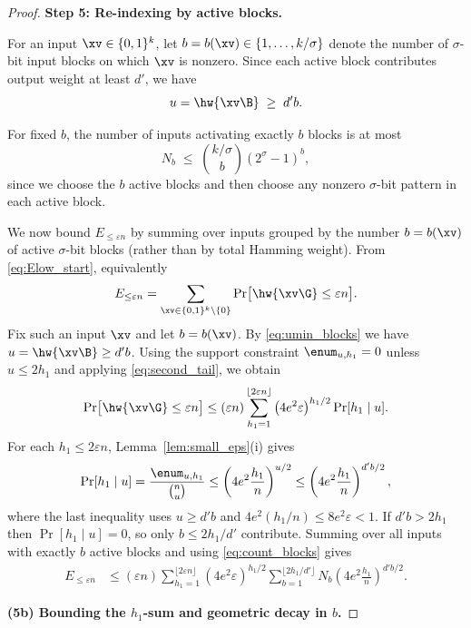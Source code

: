 \begin{proof}
\medskip
\noindent\textbf{Step 5: Re-indexing by active blocks.}

For an input $\xv\in\{0,1\}^k$, let $b=b(\xv)\in\{1,\dots,k/\sigma\}$ denote
the number of $\sigma$-bit input blocks on which $\xv$ is nonzero.
Since each active block contributes output weight at least $d'$, we have
\begin{equation}
\label{eq:umin_blocks}
u=\hw{\xv\B}\;\ge\; d' b .
\end{equation}

For fixed $b$, the number of inputs activating exactly $b$ blocks is at most
\begin{equation}
\label{eq:count_blocks}
N_b \;\le\; \binom{k/\sigma}{b}(2^\sigma-1)^b,
\end{equation}
since we choose the $b$ active blocks and then choose any nonzero
$\sigma$-bit pattern in each active block.


We now bound $E_{\le \varepsilon n}$ by summing over inputs grouped by the number
$b=b(\xv)$ of active $\sigma$-bit blocks (rather than by total Hamming weight).
From \eqref{eq:Elow_start}, equivalently
\[
E_{\le \varepsilon n}
=
\sum_{\xv\in\{0,1\}^k\setminus\{0\}}
\Pr\!\big[\hw{\xv\G}\le \varepsilon n\big].
\]
Fix such an input $\xv$ and let $b=b(\xv)$. By \eqref{eq:umin_blocks} we have
$u=\hw{\xv\B}\ge d'b$. Using the support constraint $\enum_{u,h_1}=0$ unless
$u\le 2h_1$ and applying \eqref{eq:second_tail}, we obtain
\[
\Pr\!\big[\hw{\xv\G}\le \varepsilon n\big]
\le
(\varepsilon n)\sum_{h_1=1}^{\lfloor 2\varepsilon n\rfloor}
\left(4e^2\varepsilon\right)^{h_1/2}\Pr[h_1\mid u].
\]
For each $h_1\le 2\varepsilon n$, Lemma~\ref{lem:small_eps}(i) gives
\[
\Pr[h_1\mid u]=\frac{\enum_{u,h_1}}{\binom{n}{u}}
\le
\left(4e^2\frac{h_1}{n}\right)^{u/2}
\le
\left(4e^2\frac{h_1}{n}\right)^{d'b/2},
\]
where the last inequality uses $u\ge d'b$ and $4e^2(h_1/n)\le 8e^2\varepsilon<1$.
If $d'b>2h_1$ then $\Pr[h_1\mid u]=0$, so only $b\le 2h_1/d'$ contribute.
Summing over all inputs with exactly $b$ active blocks and using \eqref{eq:count_blocks}
gives
\begin{align}
E_{\le \varepsilon n}
&\le
(\varepsilon n)
\sum_{h_1=1}^{\lfloor 2\varepsilon n\rfloor}
\left(4e^2\varepsilon\right)^{h_1/2}
\sum_{b=1}^{\lfloor 2h_1/d'\rfloor}
N_b\left(4e^2\frac{h_1}{n}\right)^{d'b/2}.
\label{eq:Elow_bh1}
\end{align}



\medskip
\noindent\textbf{(5b) Bounding the $h_1$-sum and geometric decay in $b$.}


\end{proof}
